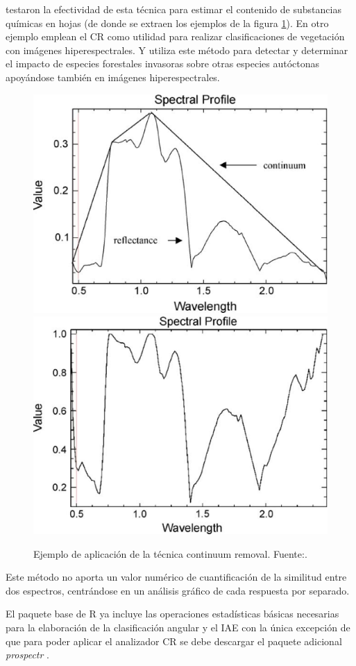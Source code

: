 \cite{huang2004estimating} testaron la efectividad de esta técnica para estimar el contenido de substancias químicas en hojas (de donde se extraen los ejemplos de la figura \ref{fig:ejemploCR}). En otro ejemplo \cite{filippi2007effect} emplean el \ac{CR} como utilidad para realizar clasificaciones de vegetación con imágenes hiperespectrales. Y \cite{underwood2003mapping} utiliza este método para detectar y determinar el impacto de especies forestales invasoras sobre otras especies autóctonas apoyándose también en imágenes hiperespectrales.%

\begin{figure}
	\centering
	\includegraphics[width=0.5\linewidth]{./Imagenes/CR1.eps}
	\includegraphics[width=0.5\linewidth]{./Imagenes/CR2.eps}
	\caption[Continuum Removal ejemplo]{Ejemplo de aplicación de la técnica continuum removal. Fuente:\cite{huang2004estimating}.}
	\label{fig:ejemploCR}
\end{figure}

Este método no aporta un valor numérico de cuantificación de la similitud entre dos espectros, centrándose en un análisis gráfico de cada respuesta por separado.%

El paquete base de R ya incluye las operaciones estadísticas básicas necesarias para la elaboración de la clasificación angular y el \ac{IAE} con la única excepción de que para poder aplicar el analizador \ac{CR} se debe descargar el paquete adicional \textit{prospectr} \citep{stevens2014introduction}.%

